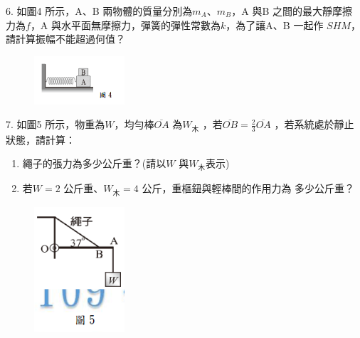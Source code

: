 \documentclass[cn,10pt,math=newtx,chinesefont=founder,device=ig]{elegantbook}
\begin{document}
\newpage


\begin{example}
   6. 如圖4 所示，A、B 兩物體的質量分別為$m_A、m_B$，A 與B 之間的最大靜摩擦
力為$f$，A 與水平面無摩擦力，彈簧的彈性常數為$k$，為了讓A、B 一起作
$SHM$，請計算振幅不能超過何值？\\
    \rightline{[高雄聯招教甄109]}
\end{example}
\begin{solution}
    
\end{solution}
\begin{figure}[htbp]
    \flushright
    \includegraphics[width=0.3\textwidth]{image/109高雄6.png}
  \end{figure}
\newpage

\begin{example}
   7. 如圖5 所示，物重為$W$，均勻棒$\overline{OA}$ 為$W_木$  ，若$\overline{OB}=\frac{2}{3} \overline{OA}$ ，若系統處於靜止
狀態，請計算：
\begin{enumerate}[label=(\arabic*)] 
  \item 繩子的張力為多少公斤重？(請以$W$ 與$W_木$表示)
  \item 若$W=2$ 公斤重、$W_木=4$ 公斤，重樞鈕與輕棒間的作用力為
多少公斤重？
    \end{enumerate}


    \rightline{[高雄聯招教甄109]}
\end{example}
\begin{solution}
    
\end{solution}
\begin{figure}[htbp]
    \flushright
    \includegraphics[width=0.3\textwidth]{image/109高雄7.png}
  \end{figure}
\newpage
\end{document}
